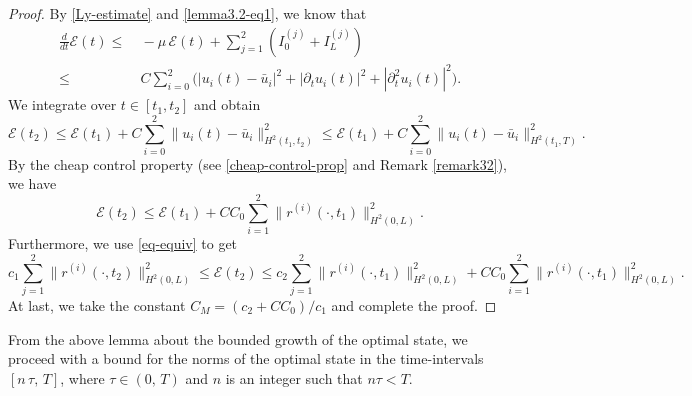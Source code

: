 \documentclass[12pt]{article}
\numberwithin{equation}{section}
\begin{document}
\begin{proof}
By \eqref{Ly-estimate} and \eqref{lemma3.2-eq1}, we know that 
\begin{align*}
\frac{d}{dt}\mathcal{E}(t) \leq&~ -\mu \,  \mathcal{E}(t)+\sum_{j=1}^2\left(I^{(j)}_0+I^{(j)}_L\right)\\
\leq &~C\sum_{i=0}^2\Big(|u_i(t)-\bar{u}_i|^2+|\partial_tu_i(t)|^2+|\partial_t^2u_i(t)|^2\Big).
\end{align*}
We integrate over $t\in[t_1,t_2]$ and obtain
$$
\mathcal{E}(t_2)\leq \mathcal{E}(t_1) + C\sum_{i=0}^2\|u_i(t)-\bar{u}_i\|_{H^2(t_1,t_2)}^2\leq \mathcal{E}(t_1) + C\sum_{i=0}^2\|u_i(t)-\bar{u}_i\|_{H^2(t_1,T)}^2.
$$
By the cheap control property (see \eqref{cheap-control-prop} and Remark \ref{remark32}), we have
$$
\mathcal{E}(t_2) \leq \mathcal{E}(t_1) + CC_0 \sum_{i=1}^2 \|r^{(i)}(\cdot,t_1)\|^2_{H^2(0,L)}.
$$
Furthermore, we use \eqref{eq-equiv} to get
$$
c_1 \sum_{j=1}^2\|r^{(i)}(\cdot,t_2)\|^2_{H^2(0,L)} \leq \mathcal{E}(t_2) \leq c_2 \sum_{j=1}^2\|r^{(i)}(\cdot,t_1)\|^2_{H^2(0,L)}  + CC_0 \sum_{i=1}^2 \|r^{(i)}(\cdot,t_1)\|^2_{H^2(0,L)}.
$$
At last, we take the constant $C_M=(c_2+CC_0)/c_1$ and complete the proof.
\end{proof}
\noindent 
From the above lemma about the bounded growth of the optimal state, we proceed with
a  bound for the norms of the optimal state in the time-intervals $[n\, \tau,  \, T]$,
where
$\tau \in (0, \, T)$ and  $n$ is an integer such that $n\tau <T$.
\end{document}
